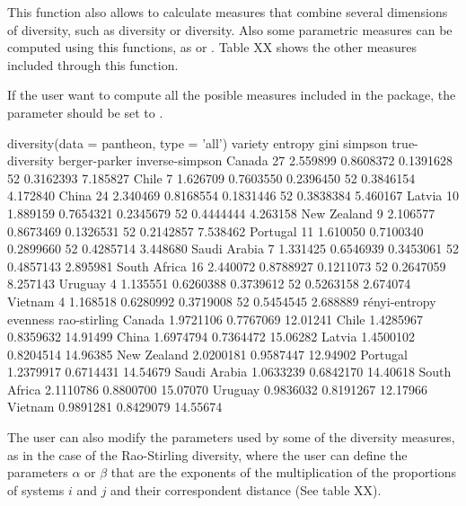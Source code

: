 This function also allows to calculate measures that combine several dimensions of diversity, such as  diversity or  diversity. Also some parametric measures can be computed using this functions, as  or . Table XX shows the other measures included through this function.

If the user want to compute all the posible measures included in the package, the parameter  should be set to .

\begin{example}
  diversity(data = pantheon, type = 'all')
    variety  entropy      gini   simpson true-diversity berger-parker inverse-simpson
Canada            27 2.559899 0.8608372 0.1391628             52     0.3162393        7.185827
Chile              7 1.626709 0.7603550 0.2396450             52     0.3846154        4.172840
China             24 2.340469 0.8168554 0.1831446             52     0.3838384        5.460167
Latvia            10 1.889159 0.7654321 0.2345679             52     0.4444444        4.263158
New Zealand        9 2.106577 0.8673469 0.1326531             52     0.2142857        7.538462
Portugal          11 1.610050 0.7100340 0.2899660             52     0.4285714        3.448680
Saudi Arabia       7 1.331425 0.6546939 0.3453061             52     0.4857143        2.895981
South Africa      16 2.440072 0.8788927 0.1211073             52     0.2647059        8.257143
Uruguay            4 1.135551 0.6260388 0.3739612             52     0.5263158        2.674074
Vietnam            4 1.168518 0.6280992 0.3719008             52     0.5454545        2.688889
             rényi-entropy  evenness rao-stirling
Canada           1.9721106 0.7767069     12.01241
Chile            1.4285967 0.8359632     14.91499
China            1.6974794 0.7364472     15.06282
Latvia           1.4500102 0.8204514     14.96385
New Zealand      2.0200181 0.9587447     12.94902
Portugal         1.2379917 0.6714431     14.54679
Saudi Arabia     1.0633239 0.6842170     14.40618
South Africa     2.1110786 0.8800700     15.07070
Uruguay          0.9836032 0.8191267     12.17966
Vietnam          0.9891281 0.8429079     14.55674
\end{example}

The user can also modify the parameters used by some of the diversity measures, as in the case of the Rao-Stirling diversity, where the user can define the parameters $\alpha$ or $\beta$ that are the exponents of the multiplication of the proportions of systems $i$ and $j$ and their correspondent distance (See table XX).

